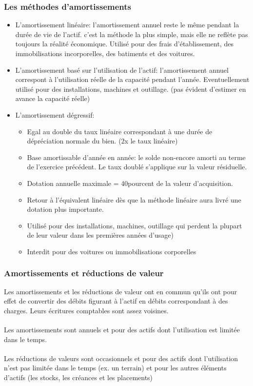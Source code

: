 \documentclass{article}
\begin{document}
\subsubsection*{Les méthodes d'amortissements}
\begin{itemize}
    \item L'amortissement linéaire: l'amortissement annuel reste le même pendant la durée de vie de l'actif. c'est la méthode la plus simple, mais elle ne reflète pas toujours la réalité économique. Utilisé pour des frais d'établissement, des immobilisations incorporelles, des batiments et des voitures.
    \item L'amortissement basé sur l'utilisation de l'actif: l'amortissement annuel correspont à l'utilisation réelle de la capacité pendant l'année. Eventuellement utilisé pour des installations, machines et outillage. (pas évident d'estimer en avance la capacité réelle)
    \item L'amortissement dégressif:
    \begin{itemize}
        \item Egal au double du taux linéaire correspondant à une durée de dépréciation normale du bien. (2x le taux linéaire)
        \item Base amortissable d'année en année: le solde non-encore amorti au terme de l'exercice précédent. Le taux doublé s'applique sur la valeur résiduelle.
        \item Dotation annuelle maximale = 40pourcent de la valeur d'acquisition.
        \item Retour à l'équivalent linéaire dès que la méthode linéaire aura livré une dotation plus importante.
        \item Utilisé pour des installations, machines, outillage qui perdent la plupart de leur valeur dans les premières années d'usage)
        \item Interdit pour des voitures ou immobilisations corporelles
    \end{itemize}
\end{itemize}
\subsubsection*{Amortissements et réductions de valeur}
Les amortissements et les réductions de valeur ont en commun qu'ils ont pour effet de convertir des débits figurant à l'actif en débits correspondant à des charges. Leurs écritures comptables sont assez voisines.\\ \\
Les amortissements sont annuels et pour des actifs dont l'utilisation est limitée dans le temps. \\ \\
Les réductions de valeurs sont occasionnels et pour des actifs dont l'utilisation n'est pas limitée dans le temps (ex. un terrain) et pour les autres éléments d'actifs (les stocks, les créances et les placements) \\ \\
\end{document}
